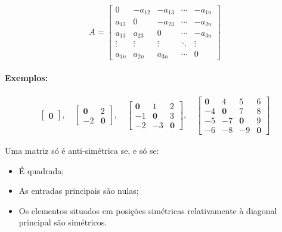 \[
    A = \begin{bmatrix}
        0      & -a_{12} & -a_{13} & \cdots & -a_{1n} \\
        a_{12} & 0       & -a_{23} & \cdots & -a_{2n} \\
        a_{13} & a_{23}  & 0       & \cdots & -a_{3n} \\
        \vdots & \vdots  & \vdots  & \ddots & \vdots  \\
        a_{1n} & a_{2n}  & a_{3n}  & \cdots & 0
    \end{bmatrix}
\]

\paragraph{Exemplos:}

\[
    \begin{matrix}
        \begin{bmatrix}
            \mathbf{0}
        \end{bmatrix},
        \quad
        \begin{bmatrix}
            \mathbf{0} & 2          \\
            -2         & \mathbf{0}
        \end{bmatrix},
        \quad
        \begin{bmatrix}
            \mathbf{0} & 1          & 2          \\
            -1         & \mathbf{0} & 3          \\
            -2         & -3         & \mathbf{0}
        \end{bmatrix},
        \quad
        \begin{bmatrix}
            \mathbf{0} & 4          & 5          & 6          \\
            -4         & \mathbf{0} & 7          & 8          \\
            -5         & -7         & \mathbf{0} & 9          \\
            -6         & -8         & -9         & \mathbf{0}
        \end{bmatrix}
    \end{matrix}
\]

\begin{infoclean}
    Uma matriz só é anti-simétrica se, e só se:
    \begin{itemize}
        \item É quadrada;
        \item As entradas principais são nulas;
        \item Os elementos situados em posições simétricas relativamente à diagonal principal são simétricos.
    \end{itemize}
\end{infoclean}

